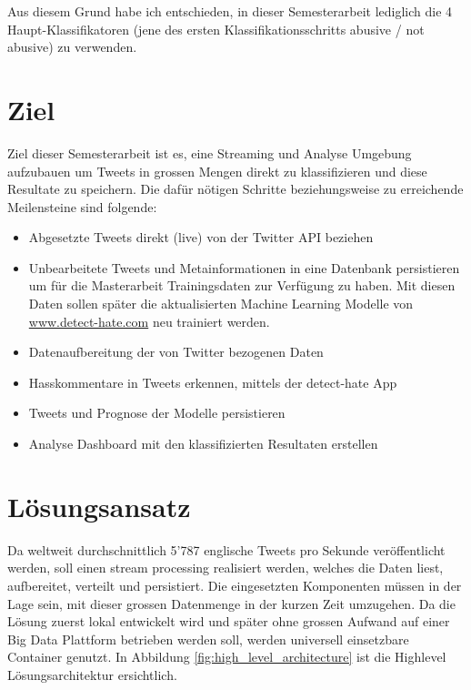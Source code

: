Aus diesem Grund habe ich entschieden, in dieser Semesterarbeit lediglich die 4 Haupt-Klassifikatoren (jene des ersten Klassifikationsschritts abusive / not abusive) zu verwenden.

\section{Ziel}
\label{sec:ziel}
Ziel dieser Semesterarbeit ist es, eine Streaming und Analyse Umgebung aufzubauen um Tweets in grossen Mengen direkt zu klassifizieren und diese Resultate zu speichern. Die daf{\"u}r n{\"o}tigen Schritte beziehungsweise zu erreichende Meilensteine sind folgende:
\begin{itemize}
\item Abgesetzte Tweets direkt (live) von der Twitter API beziehen
\item Unbearbeitete Tweets und Metainformationen in eine Datenbank persistieren um f{\"u}r die Masterarbeit Trainingsdaten zur Verf{\"u}gung zu haben. Mit diesen Daten sollen sp{\"a}ter die aktualisierten Machine Learning Modelle von  \href{http://www.detect-hate.com}{www.detect-hate.com} neu trainiert werden.  
\item Datenaufbereitung der von Twitter bezogenen Daten
\item Hasskommentare in Tweets erkennen, mittels der detect-hate App
\item Tweets und Prognose der Modelle persistieren
\item Analyse Dashboard mit den klassifizierten Resultaten erstellen
\end{itemize}

\section{L{\"o}sungsansatz}
\label{sec:introduction_solution}
Da weltweit durchschnittlich 5'787 englische Tweets pro Sekunde ver{\"o}ffentlicht werden, soll einen stream processing realisiert werden, welches die Daten liest, aufbereitet, verteilt und persistiert. Die eingesetzten Komponenten m{\"u}ssen in der Lage sein, mit dieser grossen Datenmenge in der kurzen Zeit umzugehen. Da die L{\"o}sung zuerst lokal entwickelt wird und sp{\"a}ter ohne grossen Aufwand auf einer Big Data Plattform betrieben werden soll, werden universell einsetzbare Container genutzt. In Abbildung \ref{fig:high_level_architecture} ist die Highlevel L{\"o}sungsarchitektur ersichtlich. 

